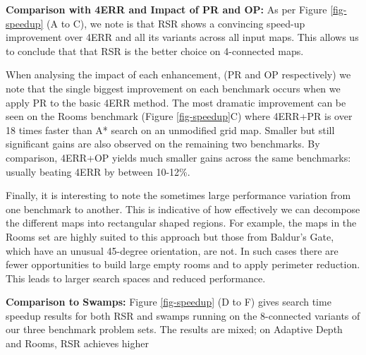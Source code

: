 \par \noindent \newline
\textbf{Comparison with 4ERR and Impact of PR and OP:}
As per Figure \ref{fig-speedup} (A to C), we note is that RSR shows a convincing 
speed-up improvement over 4ERR and all its variants across all input maps.
This allows us to conclude that that RSR is the better choice on 4-connected maps.
\par
When analysing the impact of each enhancement, (PR and OP respectively)
we note that the single biggest improvement on each
benchmark occurs when we apply PR to the basic 4ERR method.
The most dramatic improvement can be seen on the Rooms benchmark (Figure \ref{fig-speedup}C) 
where 4ERR+PR is over 18 times faster than A* search on an unmodified grid map.
Smaller but still significant gains are also observed on the remaining two
benchmarks.
By comparison, 4ERR+OP yields much smaller gains across the same
benchmarks: usually beating 4ERR by between 10-12\%.
\par
Finally, it is interesting to note the sometimes large performance variation 
from one benchmark to another. This is indicative of how effectively we can 
decompose the different maps into rectangular shaped regions.
For example, the maps in the Rooms set are highly suited to this approach but those
from Baldur's Gate, which have an unusual 45-degree orientation, are not.
In such cases there are fewer opportunities to build large empty rooms and to apply perimeter reduction.
This leads to larger search spaces and reduced performance. 
\par \noindent \newline
\textbf{Comparison to Swamps:}
Figure \ref{fig-speedup} (D to F) gives search time speedup results for both RSR
and swamps running on the 8-connected variants of our three benchmark problem
sets.  The results are mixed; on Adaptive Depth and Rooms, RSR achieves higher
